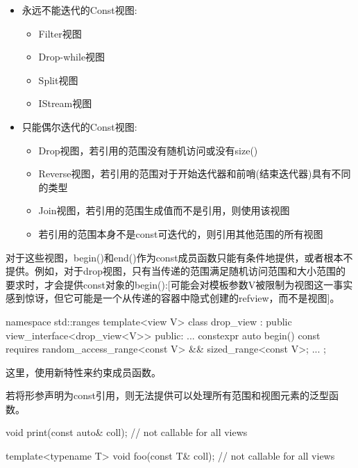\begin{itemize}
\item
永远不能迭代的Const视图:

\begin{itemize}
\item
Filter视图

\item
Drop-while视图

\item
Split视图

\item
IStream视图
\end{itemize}

\item
只能偶尔迭代的Const视图:

\begin{itemize}
\item
Drop视图，若引用的范围没有随机访问或没有size()

\item
Reverse视图，若引用的范围对于开始迭代器和前哨(结束迭代器)具有不同的类型

\item
Join视图，若引用的范围生成值而不是引用，则使用该视图

\item
若引用的范围本身不是const可迭代的，则引用其他范围的所有视图
\end{itemize}
\end{itemize}

对于这些视图，begin()和end()作为const成员函数只能有条件地提供，或者根本不提供。例如，对于drop视图，只有当传递的范围满足随机访问范围和大小范围的要求时，才会提供const对象的begin():[可能会对模板参数V被限制为视图这一事实感到惊讶，但它可能是一个从传递的容器中隐式创建的refview，而不是视图]。


\begin{cpp}
namespace std::ranges {
	template<view V>
	class drop_view : public view_interface<drop_view<V>> {
		public:
		...
		constexpr auto begin() const requires random_access_range<const V>
		&& sized_range<const V>;
		...
	};
}
\end{cpp}

这里，使用新特性来约束成员函数。

若将形参声明为const引用，则无法提供可以处理所有范围和视图元素的泛型函数。

\begin{cpp}
void print(const auto& coll); // not callable for all views

template<typename T>
void foo(const T& coll); // not callable for all views
\end{cpp}

